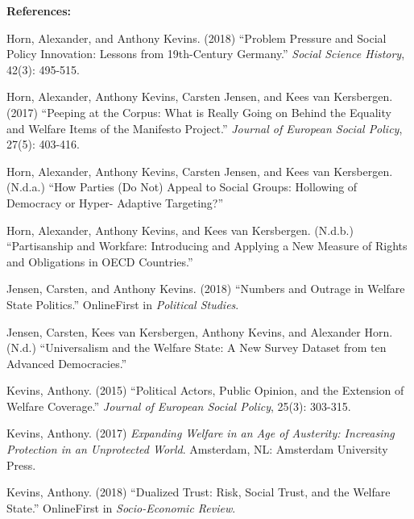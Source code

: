 \documentclass[letterpaper]{scrartcl}
\begin{document}
  \pagebreak

  \textbf{References:}
  \vspace{-.5em}

  \begin{hangparas}{.25in}{1}

    Horn, Alexander, and Anthony Kevins. (2018) ``Problem Pressure and Social Policy Innovation: Lessons from 19th-Century Germany.'' \textit{Social Science History}, 42(3): 495-515.
    \vspace{-.5em}

    Horn, Alexander, Anthony Kevins, Carsten Jensen, and Kees van Kersbergen. (2017) ``Peeping at the Corpus: What is Really Going on Behind the Equality and Welfare Items of the Manifesto Project.'' \textit{Journal of European Social Policy}, 27(5): 403-416.
    \vspace{-.5em}

    Horn, Alexander, Anthony Kevins, Carsten Jensen, and Kees van Kersbergen. (N.d.a.) ``How Parties (Do Not) Appeal to Social Groups: Hollowing of Democracy or Hyper- Adaptive Targeting?''
    \vspace{-.5em}

    Horn, Alexander, Anthony Kevins, and Kees van Kersbergen. (N.d.b.) ``Partisanship and Workfare: Introducing and Applying a New Measure of Rights and Obligations in OECD Countries.''
    \vspace{-.5em}

    Jensen, Carsten, and Anthony Kevins. (2018) ``Numbers and Outrage in Welfare State Politics.'' OnlineFirst in \textit{Political Studies}.
    \vspace{-.5em}

    Jensen, Carsten, Kees van Kersbergen, Anthony Kevins, and Alexander Horn. (N.d.) ``Universalism and the Welfare State: A New Survey Dataset from ten Advanced Democracies.''
    \vspace{-.5em}

    Kevins, Anthony. (2015) ``Political Actors, Public Opinion, and the Extension of Welfare Coverage.'' \textit{Journal of European Social Policy}, 25(3): 303-315.
    \vspace{-.5em}

    Kevins, Anthony. (2017) \textit{Expanding Welfare in an Age of Austerity: Increasing Protection in an Unprotected World}. Amsterdam, NL: Amsterdam University Press.
    \vspace{-.5em}

    Kevins, Anthony. (2018) ``Dualized Trust: Risk, Social Trust, and the Welfare State.'' OnlineFirst in \textit{Socio-Economic Review}.
    \vspace{-.5em}


\end{hangparas}
\end{document}

